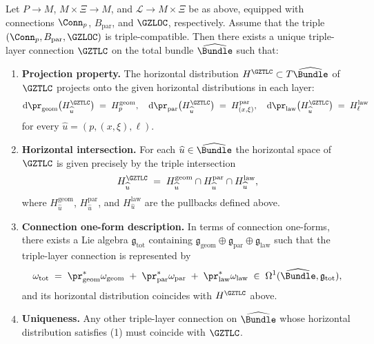 \documentclass[11pt]{book}
\theoremstyle{plain}
\theoremstyle{definition}
\begin{document}
\begin{proposition}
\label{prop:triple-layer-connection}
Let \(P\to M\), \(M\times\Xi\to M\), and
\(\mathcal{L}\to M\times\Xi\) be as above, equipped with connections
\(\Conn_p\), \(B_{\mathrm{par}}\), and \(\GZLOC\), respectively.  Assume
that the triple \((\Conn_p,B_{\mathrm{par}},\GZLOC)\) is
triple-compatible.  Then there exists a unique triple-layer connection
\(\GZTLC\) on the total bundle \(\widehat{\Bundle}\) such that:

\begin{enumerate}
  \item[\textnormal{(1)}] \textbf{Projection property.}
    The horizontal distribution \(H^{\GZTLC}\subset
    T\widehat{\Bundle}\) of \(\GZTLC\) projects onto the given
    horizontal distributions in each layer:
    \[
      \mathrm{d}\pr_{\mathrm{geom}}\bigl(
        H^{\GZTLC}_{\widehat{u}}
      \bigr)
      \;=\;
      H^{\mathrm{geom}}_p,\quad
      \mathrm{d}\pr_{\mathrm{par}}\bigl(
        H^{\GZTLC}_{\widehat{u}}
      \bigr)
      \;=\;
      H^{\mathrm{par}}_{(x,\xi)},\quad
      \mathrm{d}\pr_{\mathrm{law}}\bigl(
        H^{\GZTLC}_{\widehat{u}}
      \bigr)
      \;=\;
      H^{\mathrm{law}}_{\ell}
    \]
    for every \(\widehat{u}=(p,(x,\xi),\ell)\).
  \item[\textnormal{(2)}] \textbf{Horizontal intersection.}
    For each \(\widehat{u}\in\widehat{\Bundle}\) the horizontal space
    of \(\GZTLC\) is given precisely by the triple intersection
    \[
      H^{\GZTLC}_{\widehat{u}}
      \;=\;
      H_{\widehat{u}}^{\mathrm{geom}}
      \cap
      H_{\widehat{u}}^{\mathrm{par}}
      \cap
      H_{\widehat{u}}^{\mathrm{law}},
    \]
    where \(H_{\widehat{u}}^{\mathrm{geom}}\),
    \(H_{\widehat{u}}^{\mathrm{par}}\), and
    \(H_{\widehat{u}}^{\mathrm{law}}\) are the pullbacks defined
    above.
  \item[\textnormal{(3)}] \textbf{Connection one-form description.}
    In terms of connection one-forms, there exists a Lie algebra
    \(\mathfrak{g}_{\mathrm{tot}}\) containing
    \(\mathfrak{g}_{\mathrm{geom}}\oplus
     \mathfrak{g}_{\mathrm{par}}\oplus
     \mathfrak{g}_{\mathrm{law}}\) such that the triple-layer
    connection is represented by
    \[
      \omega_{\mathrm{tot}}
      \;=\;
      \pr_{\mathrm{geom}}^*\omega_{\mathrm{geom}}
      \;+\;
      \pr_{\mathrm{par}}^*\omega_{\mathrm{par}}
      \;+\;
      \pr_{\mathrm{law}}^*\omega_{\mathrm{law}}
      \;\in\;
      \Omega^1(\widehat{\Bundle},\mathfrak{g}_{\mathrm{tot}}),
    \]
    and its horizontal distribution coincides with
    \(H^{\GZTLC}\) above.
  \item[\textnormal{(4)}] \textbf{Uniqueness.}
    Any other triple-layer connection on \(\widehat{\Bundle}\) whose
    horizontal distribution satisfies \textnormal{(1)} must coincide
    with \(\GZTLC\).
\end{enumerate}
\end{proposition}
\end{document}

